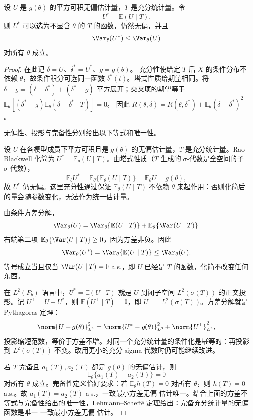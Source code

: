 \begin{theorem}
设 $U$ 是 $g(\theta)$ 的平方可积无偏估计量，$T$ 是充分统计量。令
\[
 U^*=\mathbb E(U\mid T).
\]
则 $U^*$ 可以选为不显含 $\theta$ 的 $T$ 的函数，仍然无偏，并且
\[
 \Var_\theta(U^*)\le\Var_\theta(U)
\]
对所有 $\theta$ 成立。
\end{theorem}

\begin{proof}
在此记 \(\delta=U\)、\(\delta^*=U^*\)、\(g=g(\theta)\)。
充分性使给定 \(T\) 后 \(X\) 的条件分布不依赖 \(\theta\)，故条件积分可选同一函数 \(\delta^*(t)\)。塔式性质给期望相同。将
\(\delta-g=(\delta-\delta^*)+(\delta^*-g)\) 平方展开；交叉项的期望等于
\(\mathbb E_\theta[(\delta^*-g)\mathbb E_\theta(\delta-\delta^*\mid T)]=0\)。
因此
\(R(\theta,\delta)=R(\theta,\delta^*)+
\mathbb E_\theta(\delta-\delta^*)^2\)。

无偏性、投影与完备性分别给出以下等式和唯一性。

设 $U$ 在各模型成员下平方可积且是 $g(\theta)$ 的无偏估计量，$T$ 是充分统计量。Rao--Blackwell 化简为 $U^*=\mathbb E_\theta(U\mid T)$。由塔式性质（$T$ 生成的 $\sigma$-代数是全空间的子 $\sigma$-代数），
\[
 \mathbb E_\theta U^*
 =\mathbb E_\theta\{\mathbb E_\theta(U\mid T)\}
 =\mathbb E_\theta U
 =g(\theta),
\]
故 $U^*$ 仍无偏。这里充分性通过保证 $\mathbb E_\theta(U\mid T)$ 不依赖 $\theta$ 来起作用：否则化简后的量会随参数变化，无法作为统一估计量。

由条件方差分解，
\[
 \Var_\theta(U)
 =\Var_\theta\{\mathbb E(U\mid T)\}
 +\mathbb E_\theta\{\Var(U\mid T)\}.
\]
右端第二项 $\mathbb E_\theta\{\Var(U\mid T)\}\ge0$，因为方差非负。因此
\[
 \Var_\theta(U^*)
 =\Var_\theta\{\mathbb E(U\mid T)\}
 \le\Var_\theta(U).
\]
等号成立当且仅当 $\Var(U\mid T)=0$ a.s.，即 $U$ 已经是 $T$ 的函数，化简不改变任何东西。

在 $L^2(P_\theta)$ 语言中，$U^*=\mathbb E(U\mid T)$ 就是 $U$ 到闭子空间 $L^2(\sigma(T))$ 的正交投影。记 $U^\perp=U-U^*$，则 $\mathbb E(U^\perp\mid T)=0$，即 $U^\perp\perp L^2(\sigma(T))$。方差分解就是 Pythagoras 定理：
\[
 \norm{U-g(\theta)}_{L^2}^2
 =\norm{U^*-g(\theta)}_{L^2}^2
 +\norm{U^\perp}_{L^2}^2,
\]
投影缩短范数，等价于方差不增。对同一个充分统计量的条件化是幂等的：再投影到 $L^2(\sigma(T))$ 不变。改用更小的充分 sigma 代数时仍可能继续改进。

若 $T$ 完备且 $a_1(T),a_2(T)$ 都是 $g(\theta)$ 的无偏估计，则
\[
 \mathbb E_\theta\{a_1(T)-a_2(T)\}=0
\]
对所有 $\theta$ 成立。完备性定义恰好要求：若 $\mathbb E_\theta h(T)=0$ 对所有 $\theta$，则 $h(T)=0$ a.s.。故 $a_1(T)=a_2(T)$ a.s.，一致最小方差无偏 估计唯一。结合上面的方差不等式与完备性给出的唯一性，Lehmann--Scheff\'e 定理给出：完备充分统计量的无偏函数是唯一 一致最小方差无偏 估计。
\end{proof}


